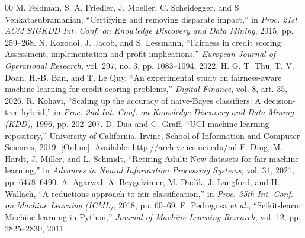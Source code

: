 \documentclass[conference]{IEEEtran}
\begin{document}
\begin{thebibliography}{00}
 M. Feldman, S. A. Friedler, J. Moeller, C. Scheidegger, and S. Venkatasubramanian, ``Certifying and removing disparate impact,'' in \textit{Proc. 21st ACM SIGKDD Int. Conf. on Knowledge Discovery and Data Mining}, 2015, pp. 259--268.
 N. Kozodoi, J. Jacob, and S. Lessmann, ``Fairness in credit scoring: Assessment, implementation and profit implications,'' \textit{European Journal of Operational Research}, vol. 297, no. 3, pp. 1083--1094, 2022.
 H. G. T. Thu, T. V. Doan, H.-B. Ban, and T. Le Quy, ``An experimental study on fairness-aware machine learning for credit scoring problems,'' \textit{Digital Finance}, vol. 8, art. 35, 2026.
 R. Kohavi, ``Scaling up the accuracy of naive-Bayes classifiers: A decision-tree hybrid,'' in \textit{Proc. 2nd Int. Conf. on Knowledge Discovery and Data Mining (KDD)}, 1996, pp. 202--207.
 D. Dua and C. Graff, ``UCI machine learning repository,'' University of California, Irvine, School of Information and Computer Sciences, 2019. [Online]. Available: http://archive.ics.uci.edu/ml
 F. Ding, M. Hardt, J. Miller, and L. Schmidt, ``Retiring Adult: New datasets for fair machine learning,'' in \textit{Advances in Neural Information Processing Systems}, vol. 34, 2021, pp. 6478--6490.
 A. Agarwal, A. Beygelzimer, M. Dud\'{\i}k, J. Langford, and H. Wallach, ``A reductions approach to fair classification,'' in \textit{Proc. 35th Int. Conf. on Machine Learning (ICML)}, 2018, pp. 60--69.
 F. Pedregosa \textit{et al.}, ``Scikit-learn: Machine learning in Python,'' \textit{Journal of Machine Learning Research}, vol. 12, pp. 2825--2830, 2011.
\end{thebibliography}
\end{document}
